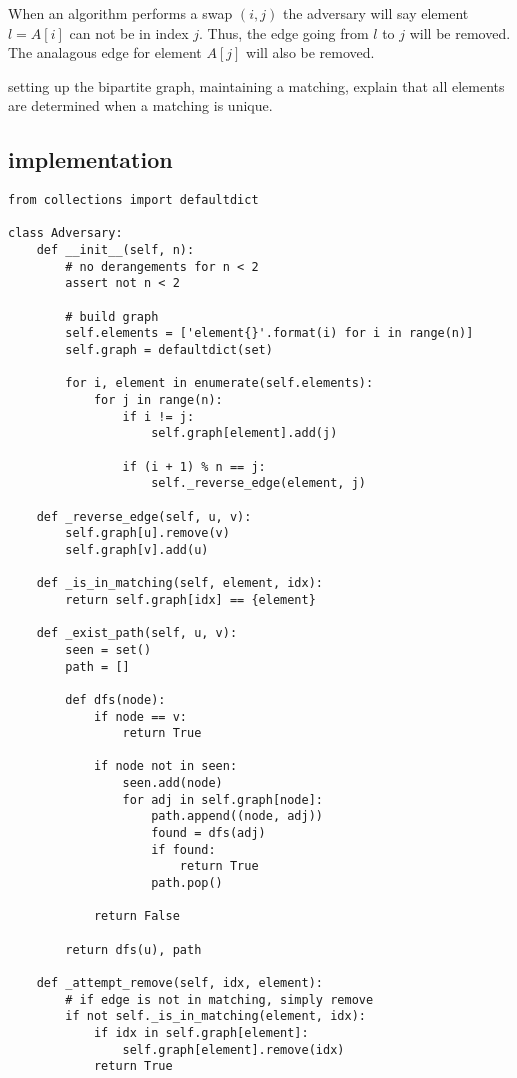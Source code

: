 \documentclass{article}
\begin{document}
When an algorithm performs a swap $(i, j)$ the adversary will say element $l = A[i]$ can not be in index $j$.
Thus, the edge going from $l$ to $j$ will be removed. The analagous edge for element $A[j]$ will also be removed.



setting up the bipartite graph, maintaining a matching, explain that all elements
are determined when a matching is unique.
\subsection{implementation}

\begin{verbatim}
from collections import defaultdict

class Adversary:
    def __init__(self, n):
        # no derangements for n < 2
        assert not n < 2

        # build graph
        self.elements = ['element{}'.format(i) for i in range(n)]
        self.graph = defaultdict(set)

        for i, element in enumerate(self.elements):
            for j in range(n):
                if i != j:
                    self.graph[element].add(j)

                if (i + 1) % n == j:
                    self._reverse_edge(element, j)

    def _reverse_edge(self, u, v):
        self.graph[u].remove(v)
        self.graph[v].add(u)

    def _is_in_matching(self, element, idx):
        return self.graph[idx] == {element}

    def _exist_path(self, u, v):
        seen = set()
        path = []

        def dfs(node):
            if node == v:
                return True

            if node not in seen:
                seen.add(node)
                for adj in self.graph[node]:
                    path.append((node, adj))
                    found = dfs(adj)
                    if found:
                        return True
                    path.pop()

            return False

        return dfs(u), path

    def _attempt_remove(self, idx, element):
        # if edge is not in matching, simply remove
        if not self._is_in_matching(element, idx):
            if idx in self.graph[element]:
                self.graph[element].remove(idx)
            return True


\end{verbatim}
\end{document}

